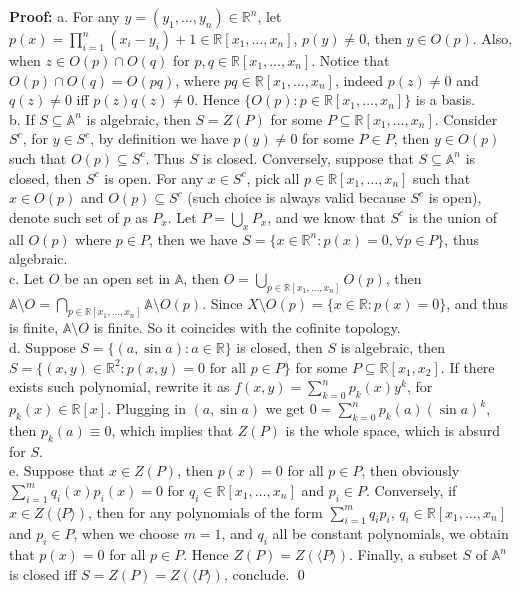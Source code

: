 \documentclass[12pt]{article}
\begin{document}
\textbf{Proof:} a. For any $y=(y_{1}, \dots, y_{n})\in\mathbb{R}^{n}$, let $p(x)=\prod_{i=1}^{n}(x_{i}-y_{i})+1\in\mathbb{R}[x_{1}, \dots, x_{n}]$, $p(y)\neq 0$, then $y\in O(p)$. Also, when $z\in O(p)\cap O(q)$ for $p,q\in\mathbb{R}[x_{1}, \dots, x_{n}]$. Notice that $O(p)\cap O(q)=O(pq)$, where $pq\in\mathbb{R}[x_{1}, \dots, x_{n}]$, indeed $p(z)\neq 0$ and $q(z)\neq 0$ iff $p(z)q(z)\neq 0$. Hence $\{O(p): p\in\mathbb{R}[x_{1}, \dots, x_{n}]\}$ is a basis. \\
\indent b. If $S\subseteq\mathbb{A}^{n}$ is algebraic, then $S=Z(P)$ for some $P\subseteq\mathbb{R}[x_{1}, \dots, x_{n}]$. Consider $S^{c}$, for $y\in S^{c}$, by definition we have $p(y)\neq 0$ for some $P\in P$, then $y\in O(p)$ such that $O(p)\subseteq S^{c}$. Thus $S$ is closed. Conversely, suppose that $S\subseteq\mathbb{A}^{n}$ is closed, then $S^{c}$ is open. For any $x\in S^{c}$, pick all $p\in\mathbb{R}[x_{1}, \dots, x_{n}]$ such that $x\in O(p)$ and $O(p)\subseteq S^{c}$ (such choice is always valid because $S^{c}$ is open), denote such set of $p$ as $P_{x}$. Let $P=\bigcup_{x}P_{x}$, and we know that $S^{c}$ is the union of all $O(p)$ where $p\in P$, then we have $S=\{x\in\mathbb{R}^{n}: p(x)=0,\forall p\in P\}$, thus algebraic. \\
\indent c. Let $O$ be an open set in $\mathbb{A}$, then $O=\bigcup_{p\in\mathbb{R}[x_{1}, \dots, x_{n}]} O(p)$, then $\mathbb{A}\setminus O=\bigcap_{p\in\mathbb{R}[x_{1}, \dots, x_{n}]}\mathbb{A}\setminus O(p)$. Since $X\setminus O(p)=\{x\in\mathbb{R}: p(x)=0\}$, and thus is finite, $\mathbb{A}\setminus O$ is finite. So it coincides with the cofinite topology. \\
\indent d. Suppose $S=\{(a,\sin a): a\in\mathbb{R}\}$ is closed, then $S$ is algebraic, then $S=\{(x,y)\in\mathbb{R}^{2}: p(x,y)=0\text{ for all } p\in P\}$ for some $P\subseteq\mathbb{R}[x_{1}, x_{2}]$. If there exists such polynomial, rewrite it as $f(x,y)=\sum\limits_{k=0}^{n}p_{k}(x)y^{k}$, for $p_{k}(x)\in\mathbb{R}[x]$. Plugging in $(a, \sin a)$ we get $0=\sum\limits_{k=0}^{n}p_{k}(a)(\sin a)^{k}$, then $p_{k}(a)\equiv 0$, which implies that $Z(P)$ is the whole space, which is absurd for $S$. \\
\indent e. Suppose that $x\in Z(P)$, then $p(x)=0$ for all $p\in P$, then obviously $\sum_{i=1}^{m}q_{i}(x)p_{i}(x)=0$ for $q_{i}\in\mathbb{R}[x_{1}, \dots, x_{n}]$ and $p_{i}\in P$. Conversely, if $x\in Z(\langle P\rangle)$, then for any polynomials of the form $\sum_{i=1}^{m}q_{i}p_{i}$, $q_{i}\in\mathbb{R}[x_{1}, \dots, x_{n}]$ and $p_{i}\in P$, when we choose $m=1$, and $q_{i}$ all be constant polynomials, we obtain that $p(x)=0$ for all $p\in P$. Hence $Z(P)=Z(\langle P\rangle)$. Finally, a subset $S$ of $\mathbb{A}^{n}$ is closed iff $S=Z(P)=Z(\langle P\rangle )$, conclude. \qed
\end{document}
